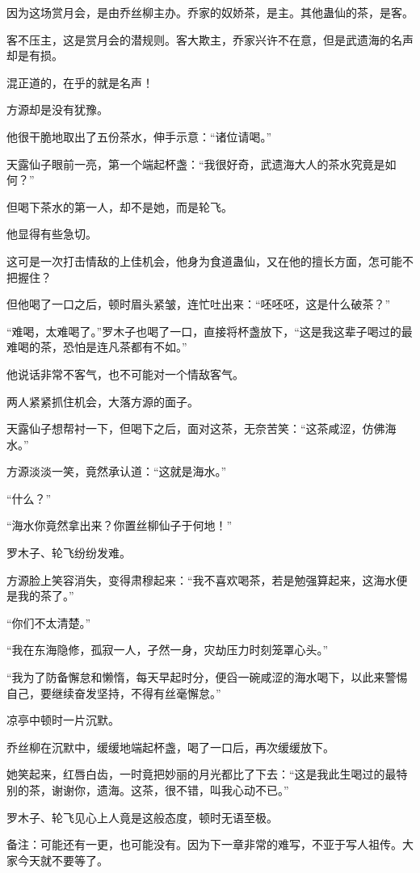 \begin{this_body}
因为这场赏月会，是由乔丝柳主办。乔家的奴娇茶，是主。其他蛊仙的茶，是客。

客不压主，这是赏月会的潜规则。客大欺主，乔家兴许不在意，但是武遗海的名声却是有损。

混正道的，在乎的就是名声！

方源却是没有犹豫。

他很干脆地取出了五份茶水，伸手示意：“诸位请喝。”

天露仙子眼前一亮，第一个端起杯盏：“我很好奇，武遗海大人的茶水究竟是如何？”

但喝下茶水的第一人，却不是她，而是轮飞。

他显得有些急切。

这可是一次打击情敌的上佳机会，他身为食道蛊仙，又在他的擅长方面，怎可能不把握住？

但他喝了一口之后，顿时眉头紧皱，连忙吐出来：“呸呸呸，这是什么破茶？”

“难喝，太难喝了。”罗木子也喝了一口，直接将杯盏放下，“这是我这辈子喝过的最难喝的茶，恐怕是连凡茶都有不如。”

他说话非常不客气，也不可能对一个情敌客气。

两人紧紧抓住机会，大落方源的面子。

天露仙子想帮衬一下，但喝下之后，面对这茶，无奈苦笑：“这茶咸涩，仿佛海水。”

方源淡淡一笑，竟然承认道：“这就是海水。”

“什么？”

“海水你竟然拿出来？你置丝柳仙子于何地！”

罗木子、轮飞纷纷发难。

方源脸上笑容消失，变得肃穆起来：“我不喜欢喝茶，若是勉强算起来，这海水便是我的茶了。”

“你们不太清楚。”

“我在东海隐修，孤寂一人，孑然一身，灾劫压力时刻笼罩心头。”

“我为了防备懈怠和懒惰，每天早起时分，便舀一碗咸涩的海水喝下，以此来警惕自己，要继续奋发坚持，不得有丝毫懈怠。”

凉亭中顿时一片沉默。

乔丝柳在沉默中，缓缓地端起杯盏，喝了一口后，再次缓缓放下。

她笑起来，红唇白齿，一时竟把妙丽的月光都比了下去：“这是我此生喝过的最特别的茶，谢谢你，遗海。这茶，很不错，叫我心动不已。”

罗木子、轮飞见心上人竟是这般态度，顿时无语至极。

备注：可能还有一更，也可能没有。因为下一章非常的难写，不亚于写人祖传。大家今天就不要等了。

\end{this_body}

